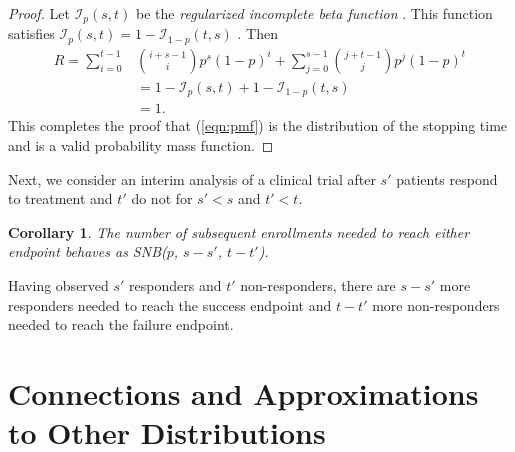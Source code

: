 \documentclass[review]{elsarticle}
\newtheorem{corollary}{Corollary}
\begin{document}
\begin{proof}
Let $\mathcal{I}_p(s, t)$ be the {\em regularized incomplete beta function} 
\citep{Olver2010}. This function satisfies 
$\mathcal{I}_p(s, t) = 1-\mathcal{I}_{1-p}(t, s)$ \citep{Uppuluri1970}. Then
\begin{align*}
R = \sum_{i=0}^{t-1} &{i+s-1 \choose i} p^s (1-p)^i +
\sum_{j=0}^{s-1}  {j+t-1 \choose j} p^j  (1-p)^t \\
   &= 1-\mathcal{I}_p(s, t) + 1 - \mathcal{I}_{1-p}(t, s) \\
   &= 1. 
\end{align*}
This completes the proof that (\ref{eqn:pmf}) is the distribution of the
stopping time and is a valid probability mass function.
\end{proof}

Next, we consider an interim analysis of a clinical trial after $s'$ 
patients respond to treatment 
and $t'$ do not for $s' < s$ and $t' < t$.
\begin{corollary} \label{conditional_distribution}
The number of subsequent enrollments needed 
to reach either endpoint behaves as SNB($p$, $s-s'$, $t-t'$).
\end{corollary}
Having observed $s'$ responders and $t'$ non-responders, there are $s-s'$ 
more responders needed to reach the success endpoint and $t-t'$ more 
non-responders needed to reach the failure endpoint.

\section{Connections and Approximations to Other Distributions}
\end{document}
